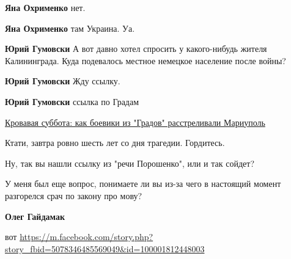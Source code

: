 \begin{itemize}
\begin{itemize}

\textbf{Яна Охрименко} нет.


\textbf{Яна Охрименко} там Украина. Уа.


\textbf{Юрий Гумовски} А вот давно хотел спросить у какого-нибудь жителя Калининграда. Куда подевалось местное немецкое население после войны?


\textbf{Юрий Гумовски} Жду ссылку.


\textbf{Юрий Гумовски} ссылка по Градам

\href{https://tsn.ua/ru/ukrayina/krovavaya-subbota-kak-boeviki-iz-gradov-rasstrelivali-mariupol-407186.html}{%
Кровавая суббота: как боевики из "Градов" расстреливали Мариуполь}

Ктати, завтра ровно шесть лет со дня трагедии. Гордитесь.



Ну, так вы нашли ссылку из "речи Порошенко", или и так сойдет?

У меня был еще вопрос, понимаете ли вы из-за чего в настоящий момент разгорелся
срач по закону про мову?



\textbf{Олег Гайдамак} 

вот \url{https://m.facebook.com/story.php?story_fbid=5078346485569049&id=100001812448003}



\end{itemize}
\end{itemize}
